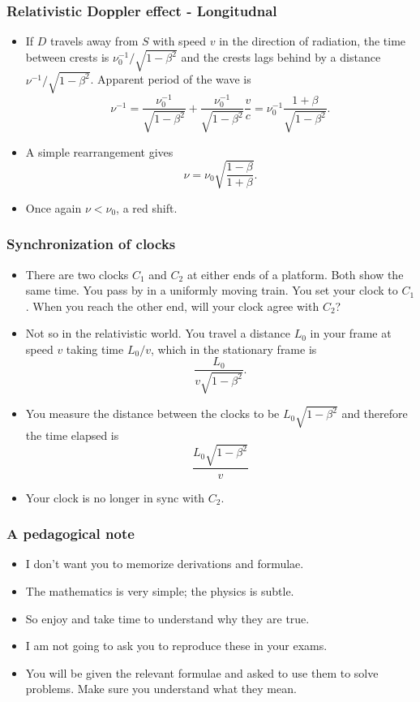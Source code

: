 \documentclass{beamer}
\begin{document}
\begin{frame}
\frametitle{Relativistic Doppler effect - Longitudnal}
\begin{itemize}
\item If $D$ travels away from $S$ with speed $v$ in the direction of radiation,
the time between crests is $\nu_0^{-1}/\sqrt{1-\beta^2}$ and the crests lags
behind by a distance $\nu^{-1}/\sqrt{1-\beta^2}$. Apparent period of the wave is
\begin{equation}\label{e4}
\nu^{-1} = \frac{\nu_0^{-1}}{\sqrt{1-\beta^2}} + 
           \frac{\nu_0^{-1}}{\sqrt{1-\beta^2}}\frac{v}{c} = 
           \nu_0^{-1}\frac{1+\beta}{\sqrt{1-\beta^2}}.
\end{equation}
\item A simple rearrangement gives
\begin{equation}\label{e5}
\nu = \nu_0\sqrt{\frac{1 - \beta}{1 + \beta}}.
\end{equation}
\item Once again $\nu < \nu_0$, a red shift.
\end{itemize}
\end{frame}

\begin{frame}
\frametitle{Synchronization of clocks}
\begin{itemize}
\item There are two clocks $C_1$ and $C_2$ at either ends of a platform. Both
show the same time. You pass by in a uniformly moving train. You set your clock 
to $C_1$. When you reach the other end, will your clock agree with $C_2$?
\item Not so in the relativistic world. You travel a distance $L_0$ in your
frame at speed $v$ taking time $L_0/v$, which in the stationary frame is
\[
\frac{L_0}{v\sqrt{1-\beta^2}}.
\]
\item You measure the distance between the clocks to be $L_0\sqrt{1-\beta^2}$
and therefore the time elapsed is
\[
\frac{L_0\sqrt{1 - \beta^2}}{v}
\]
\item Your clock is no longer in sync with $C_2$.
\end{itemize}
\end{frame}

\begin{frame}
\frametitle{A pedagogical note}
\begin{itemize}
\item I don't want you to memorize derivations and formulae.
\item The mathematics is very simple; the physics is subtle.
\item So enjoy and take time to understand why they are true.
\item I am not going to ask you to reproduce these in your exams.
\item You will be given the relevant formulae and asked to use them to solve
problems. Make sure you understand what they mean.
\end{itemize}
\end{frame}
\end{document}

